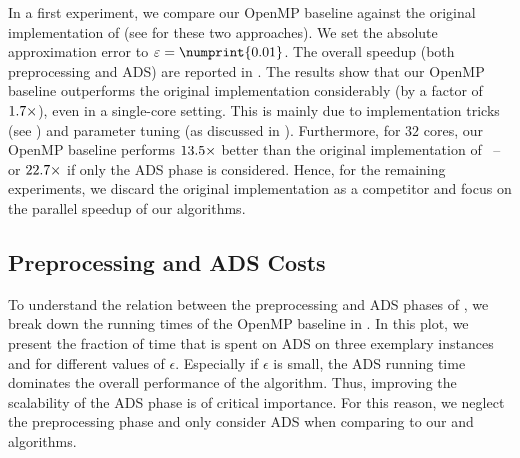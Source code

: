 In a first experiment, we compare our OpenMP baseline against the original
implementation of \kadabra (see  for these two
approaches). We set the absolute approximation error to $\epsilon =
\numprint{0.01}$. The overall speedup (\ie both preprocessing and ADS) are
reported in .
The results show that our OpenMP baseline outperforms the
original implementation considerably (by a factor of
$\onedigit{\adsSuDtVsOmp}\times$), even in a single-core setting.
%
This is mainly due to implementation tricks (see
) and parameter tuning (as discussed in
). Furthermore, for $32$ cores, our OpenMP
baseline performs $\onedigit{\overallSuOmpVsOriginal}\times$ better than the
original implementation of \kadabra\ -- or
$\onedigit{\adsSuOmpVsOriginal}\times$ if only the ADS phase is considered.
Hence, for the remaining experiments, we discard the original implementation as
a competitor and focus on the parallel speedup of our algorithms.

\subsection{Preprocessing and ADS Costs}
%
To understand the relation between the preprocessing and ADS phases of
\kadabra, we break down the running times of the OpenMP baseline
in . In this plot, we present the fraction
of time that is spent on ADS on three exemplary instances and for different
values of $\epsilon$.
Especially if $\epsilon$ is small, the ADS running time dominates the overall
performance of the algorithm.
Thus, improving the scalability of the ADS phase is of critical importance.
For this reason, we neglect the preprocessing phase and only consider ADS when
comparing to our \localframe and \sharedframe algorithms.


